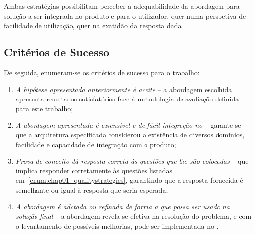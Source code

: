 Ambas estratégias possibilitam perceber a adequabilidade da abordagem para solução a ser integrada no produto e para o utilizador, quer numa perspetiva de facilidade de utilização, quer na exatidão da resposta dada.

\subsection{Critérios de Sucesso}
De seguida, enumeram-se os critérios de sucesso para o trabalho:

\begin{enumerate}
    \item 
    {
        \textit{A hipótese apresentada anteriormente é aceite} -- a abordagem escolhida apresenta resultados satisfatórios face à metodologia de avaliação definida para este trabalho;
    }
    \item
    {
        \textit{A abordagem apresentada é extensível e de fácil integração no {\productname}} -- garante-se que a arquitetura especificada considerou a existência de diversos domínios, facilidade e capacidade de integração com o produto;
    }
    \item
    {
        \textit{Prova de conceito dá resposta correta às questões que lhe são colocadas} -- que implica responder corretamente às questões listadas em~\ref{enum:chap01_qualitystrategies}, garantindo que a resposta fornecida é semelhante ou igual à resposta que seria esperada;
    }
    \item
    {
        \textit{A abordagem é adotada ou refinada de forma a que possa ser usada na solução final} -- a abordagem revela-se efetiva na resolução do problema, e com o levantamento de possíveis melhorias, pode ser implementada no {\productname}.
    }
\end{enumerate}

